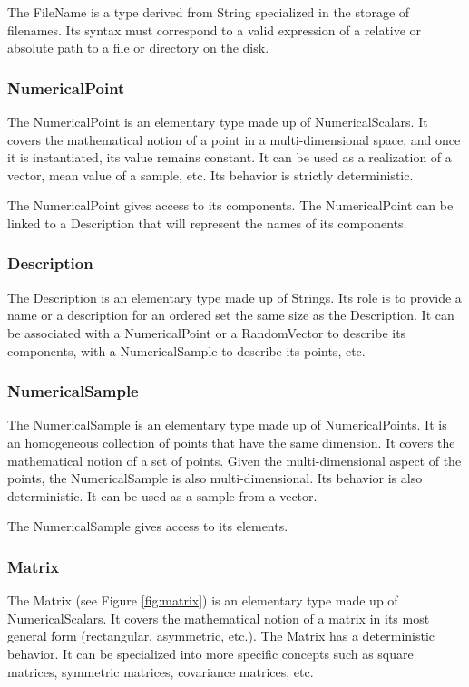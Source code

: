The FileName is a type derived from String specialized in the storage of filenames. Its syntax must correspond to a valid expression of a relative or absolute path to a file or directory on the disk.

\subsubsection{NumericalPoint}

The NumericalPoint is an elementary type made up of NumericalScalars. It covers the mathematical notion of a point in a multi-dimensional space, and once it is instantiated, its value remains constant. It can be used as a realization of a vector, mean value of a sample, etc. Its behavior is strictly deterministic.

The NumericalPoint gives access to its components. The NumericalPoint can be linked to a Description that will represent the names of its components.

\subsubsection{Description}

The Description is an elementary type made up of Strings. Its role is to provide a name or a description for an ordered set the same size as the Description. It can be associated with a NumericalPoint or a RandomVector to describe its components, with a NumericalSample to describe its points, etc.

\subsubsection{NumericalSample}

The NumericalSample is an elementary type made up of NumericalPoints. It is an homogeneous collection of points that have the same dimension. It covers the mathematical notion of a set of points. Given the multi-dimensional aspect of the points, the NumericalSample is also multi-dimensional. Its behavior is also deterministic. It can be used as a sample from a vector.

The NumericalSample gives access to its elements.

\subsubsection{Matrix}

The Matrix (see Figure \ref{fig:matrix}) is an elementary type made up of NumericalScalars. It covers the mathematical notion of a matrix in its most general form (rectangular, asymmetric, etc.). The Matrix has a deterministic behavior. It can be specialized into more specific concepts such as square matrices, symmetric matrices, covariance matrices, etc.

